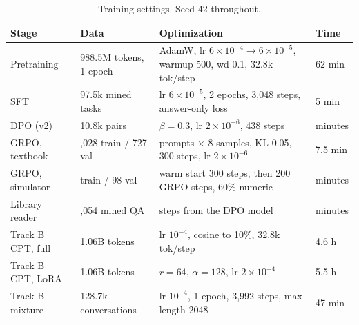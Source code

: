 \documentclass[11pt]{article}
\begin{document}
\begin{table}[h]
\centering\small
\begin{tabular}{@{}>{\raggedright\arraybackslash}p{2.6cm}>{\raggedright\arraybackslash}p{3.2cm}>{\raggedright\arraybackslash}p{7.4cm}l@{}}
\toprule
Stage & Data & Optimization & Time\\
\midrule
Pretraining & 988.5M tokens, 1 epoch & AdamW, lr $6\!\times\!10^{-4}\to6\!\times\!10^{-5}$, warmup 500, wd 0.1, 32.8k tok/step & 62 min\\
SFT & 97.5k mined tasks & lr $6\!\times\!10^{-5}$, 2 epochs, 3,048 steps, answer-only loss & 5 min\\
DPO (v2) & 10.8k pairs & $\beta=0.3$, lr $2\!\times\!10^{-6}$, 438 steps & minutes\\
GRPO, textbook & 4,028 train / 727 val & 16 prompts $\times$ 8 samples, KL 0.05, 300 steps, lr $2\!\times\!10^{-6}$ & 7.5 min\\
GRPO, simulator & 466 train / 98 val & warm start 300 steps, then 200 GRPO steps, 60\% numeric & minutes\\
Library reader & 29,054 mined QA & 800 steps from the DPO model & minutes\\
Track B CPT, full & 1.06B tokens & lr $10^{-4}$, cosine to 10\%, 32.8k tok/step & 4.6 h\\
Track B CPT, LoRA & 1.06B tokens & $r=64$, $\alpha=128$, lr $2\!\times\!10^{-4}$ & 5.5 h\\
Track B mixture & 128.7k conversations & lr $10^{-4}$, 1 epoch, 3,992 steps, max length 2048 & 47 min\\
\bottomrule
\end{tabular}
\caption{Training settings. Seed 42 throughout.}
\label{tab:hparams}
\end{table}
\end{document}
